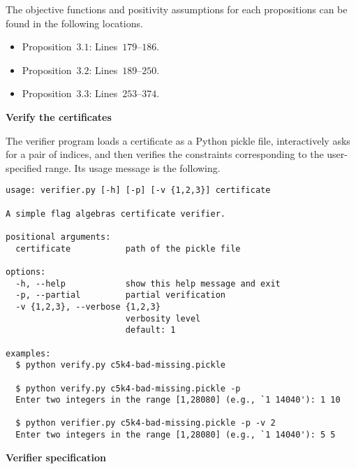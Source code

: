 \documentclass[11pt,a4paper,reqno]{amsart}
\begin{document}
The objective functions and positivity assumptions for each propositions can be found
in the following locations.

\begin{itemize}
\item Proposition~$3.1$: Lines~$179$--$186$.
\item Proposition~$3.2$: Lines~$189$--$250$.
\item Proposition~$3.3$: Lines~$253$--$374$.
\end{itemize}

\textbf{\large Verify the certificates}

The verifier program loads a certificate as a Python pickle file, interactively asks
for a pair of indices, and then verifies the constraints corresponding to the
user-specified range. Its usage message is the following.

\begin{Verbatim}[frame=single, fontsize=\small]
usage: verifier.py [-h] [-p] [-v {1,2,3}] certificate

A simple flag algebras certificate verifier.

positional arguments:
  certificate           path of the pickle file

options:
  -h, --help            show this help message and exit
  -p, --partial         partial verification
  -v {1,2,3}, --verbose {1,2,3}
                        verbosity level
                        default: 1

examples:
  $ python verify.py c5k4-bad-missing.pickle

  $ python verify.py c5k4-bad-missing.pickle -p
  Enter two integers in the range [1,28080] (e.g., `1 14040'): 1 10

  $ python verifier.py c5k4-bad-missing.pickle -p -v 2
  Enter two integers in the range [1,28080] (e.g., `1 14040'): 5 5
\end{Verbatim}

\textbf{\large Verifier specification}
\end{document}
